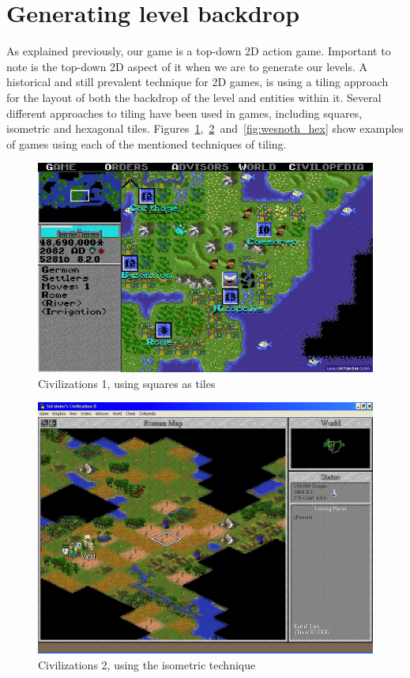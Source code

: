 \section{Generating level backdrop}
As explained previously, our game is a top-down 2D action game.
Important to note is the top-down 2D aspect of it when we are to generate our levels.
A historical and still prevalent technique for 2D games, is using a tiling approach for the layout of both the backdrop of the level and entities within it. 
Several different approaches to tiling have been used in games, including squares, isometric and hexagonal tiles.
Figures~\ref{fig:civ-1_square},~\ref{fig:civ-2_iso}~and~\ref{fig:wesnoth_hex}
show examples of games using each of the mentioned techniques of tiling.

\begin{figure}[H]
    \centering
    \includegraphics[scale=0.4]{figures/generating_levels/civ-1_square.png}
    \caption{Civilizations 1, using squares as tiles}\label{fig:civ-1_square} 
\end{figure}

\begin{figure}[H]
    \centering
    \includegraphics[scale=0.4]{figures/generating_levels/civ-2_iso.png}
    \caption{Civilizations 2, using the isometric technique}\label{fig:civ-2_iso} 
\end{figure}

